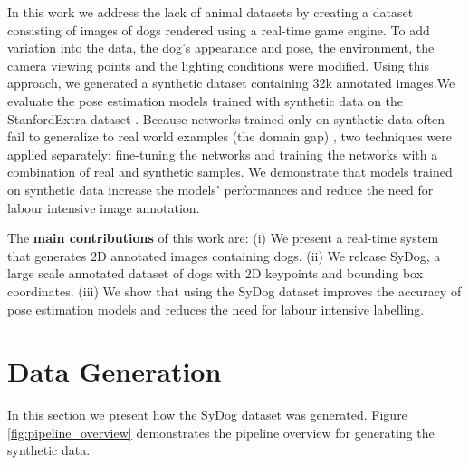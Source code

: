 \documentclass[final]{cvpr}
\begin{document}
In this work we address the lack of animal datasets by creating a dataset consisting of images of dogs rendered using a real-time game engine. 
To add variation into the data, the dog's appearance and pose, the environment, the camera viewing points and the lighting conditions were modified. Using this approach, we generated a synthetic dataset containing 32k annotated images.We evaluate the pose estimation models trained with synthetic data on the StanfordExtra dataset \cite{biggs2020left}. Because networks trained only on synthetic data often fail to generalize to real world examples (the domain gap) \cite{DBLP:journals/corr/BarbosaCCRT17,DBLP:journals/corr/abs-1807-01990}, two techniques were applied separately: fine-tuning the networks and training the networks with a combination of real and synthetic samples. We demonstrate that models trained on synthetic data increase the models' performances and reduce the need for labour intensive image annotation. 

The \textbf{main contributions} of this work are: (i) We present a real-time system that generates 2D annotated images containing dogs. (ii) We release SyDog, a large scale annotated dataset of dogs with 2D keypoints and bounding box coordinates. (iii) We show that using the SyDog dataset improves the accuracy of pose estimation models and reduces the need for labour intensive labelling.
\section{Data Generation}
In this section we present how the SyDog dataset was generated. Figure \ref{fig:pipeline_overview} demonstrates the pipeline overview for generating the synthetic data.
\end{document}
